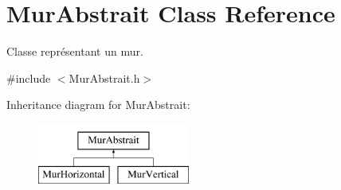 \hypertarget{classMurAbstrait}{\section{Mur\-Abstrait Class Reference}
\label{classMurAbstrait}
}


Classe représentant un mur.  




{\ttfamily \#include $<$Mur\-Abstrait.\-h$>$}

Inheritance diagram for Mur\-Abstrait\-:\begin{figure}[H]
\begin{center}
\leavevmode
\includegraphics[height=2.000000cm]{classMurAbstrait}
\end{center}
\end{figure}
